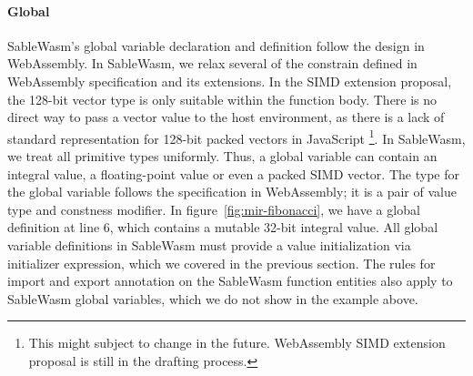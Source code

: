 \paragraph{Global}
SableWasm's global variable declaration and definition follow the design in WebAssembly. In SableWasm, we relax several of the constrain defined in WebAssembly specification and its extensions. In the SIMD extension proposal, the 128-bit vector type is only suitable within the function body. There is no direct way to pass a vector value to the host environment, as there is a lack of standard representation for 128-bit packed vectors in JavaScript \footnote{This might subject to change in the future. WebAssembly SIMD extension proposal is still in the drafting process.}. In  SableWasm, we treat all primitive types uniformly. Thus, a global variable can contain an integral value, a floating-point value or even a packed SIMD vector. The type for the global variable follows the specification in WebAssembly; it is a pair of value type and constness modifier. In figure~\ref{fig:mir-fibonacci}, we have a global definition at line 6, which contains a mutable 32-bit integral value. All global variable definitions in SableWasm must provide a value initialization via initializer expression, which we covered in the previous section. The rules for import and export annotation on the SableWasm function entities also apply to SableWasm global variables, which we do not show in the example above.

